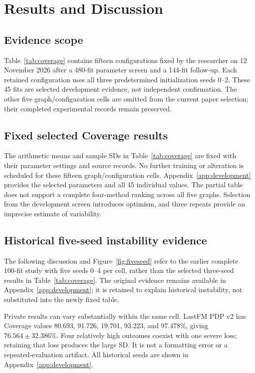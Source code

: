 \chapter{Results and Discussion}\label{ch:results}
\section{Evidence scope}
Table~\ref{tab:coverage} contains fifteen configurations fixed by the researcher on 12 November 2026 after a 480-fit parameter screen and a 144-fit follow-up. Each retained configuration uses all three predetermined initialization seeds 0--2. These 45 fits are selected development evidence, not independent confirmation. The other five graph/configuration cells are omitted from the current paper selection; their completed experimental records remain preserved.

\section{Fixed selected Coverage results}

The arithmetic means and sample SDs in Table~\ref{tab:coverage} are fixed with their parameter settings and source records. No further training or alteration is scheduled for these fifteen graph/configuration cells. Appendix~\ref{app:development} provides the selected parameters and all 45 individual values. The partial table does not support a complete four-method ranking across all five graphs. Selection from the development screen introduces optimism, and three repeats provide an imprecise estimate of variability.

\section{Historical five-seed instability evidence}
The following discussion and Figure~\ref{fig:fiveseed} refer to the earlier complete 100-fit study with five seeds 0--4 per cell, rather than the selected three-seed results in Table~\ref{tab:coverage}. The original evidence remains available in Appendix~\ref{app:development}; it is retained to explain historical instability, not substituted into the newly fixed table.

Private results can vary substantially within the same cell. LastFM PDP v2 has Coverage values 80.693, 91.726, 19.701, 93.223, and 97.478\%, giving $76.564\pm32.386$\%. Four relatively high outcomes coexist with one severe loss; retaining that loss produces the large SD. It is not a formatting error or a repeated-evaluation artifact. All historical seeds are shown in Appendix~\ref{app:development}.

